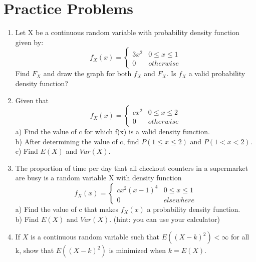 \documentclass[11pt]{article}
\begin{document}
\section{Practice Problems}
\begin{enumerate}
  \item Let X be a continuous random variable with probability density function given by:
  \begin{equation*}
    f_X(x) = 
    \begin{cases}
      3x^2 & 0 \leq x \leq 1 \\
      0 & otherwise
    \end{cases}
  \end{equation*}
  Find $F_X$ and draw the graph for both $f_X$ and $F_X$. Is $f_X$ a valid probability density function?
  \item Given that 
  \begin{equation*}
    f_X(x) = \begin{cases}
      cx^2 & 0 \leq x \leq 2 \\
      0 & otherwise
    \end{cases}
  \end{equation*}
   a) Find the value of c for which f(x) is a valid density function. \\
   b) After determining the value of c, find $P(1 \leq x \leq 2)$ and $P(1 < x < 2)$. \\
   c) Find $E(X)$ and $Var(X)$. 
  \item The proportion of time per day that all checkout counters in a supermarket are busy is a random variable X with density function
  \begin{equation*}
    f_X(x) = 
    \begin{cases}
      cx^2(x-1)^4 & 0 \leq x \leq 1 \\
      0 & elsewhere
    \end{cases}
  \end{equation*}
  a) Find the value of c that makes $f_X(x)$ a probability density function. \\
  b) Find $E(X)$ and $Var(X)$. (hint: you can use your calculator)
  \item If $X$ is a continuous random variable such that $E((X - k)^2) < \infty$ for all k, show that $E((X - k)^2)$ is minimized when $k = E(X)$.
\end{enumerate}
\end{document}
